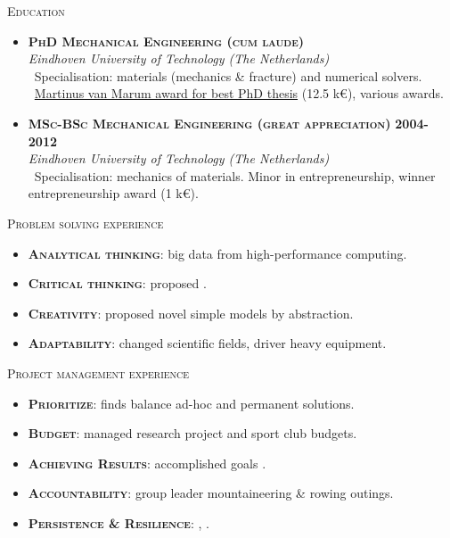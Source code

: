 \documentclass[11pt, a4paper]{article}
\newcommand{\dates}[1]{\hfill\mbox{\textbf{#1}}} %
\newcommand{\smaller}[1]{{\small\ #1}}
\newcommand{\headright}[1]{
    \vspace*{1.5ex}\textsc{\Large\color{cvblue}#1}\par%
    \vspace*{-2ex}{\color{cvblue}\hrulefill}\par
}
\begin{document}
\begin{minipage}[t]{0.56\textwidth}
    \headright{Education}

    \begin{itemize}
        \item
        \textbf{\textsc{PhD Mechanical Engineering (cum laude)}} \dates{\MyDatePhD} \\
        \textit{Eindhoven University of Technology (The Netherlands)} \\
        \smaller{Specialisation: materials (mechanics \& fracture) and numerical solvers.} \\
        \smaller{\href{https://www.geus.me/education.html\#doctor-of-philosophy}{Martinus van Marum award for best PhD thesis} (12.5 k\euro), various awards.}
        \item
        \textbf{\textsc{MSc-BSc Mechanical Engineering (great appreciation)}} \dates{2004-2012} \\
        \textit{Eindhoven University of Technology (The Netherlands)} \\
        \smaller{Specialisation: mechanics of materials. Minor in entrepreneurship, winner entrepreneurship award (1 k\euro).}
    \end{itemize}

    \headright{Problem solving experience}

    \begin{itemize}
        \item \textbf{\textsc{Analytical thinking}}: big data from high-performance computing.
        \item \textbf{\textsc{Critical thinking}}: proposed .
        \item \textbf{\textsc{Creativity}}: proposed novel simple models by abstraction.
        \item \textbf{\textsc{Adaptability}}: changed scientific fields, driver heavy equipment.
    \end{itemize}

    \headright{Project management experience}

    \begin{itemize}
        \item \textbf{\textsc{Prioritize}}: finds balance ad-hoc and permanent solutions.
        \item \textbf{\textsc{Budget}}: managed research project and sport club budgets.
        \item \textbf{\textsc{Achieving Results}}: accomplished goals .
        \item \textbf{\textsc{Accountability}}: group leader mountaineering \& rowing outings.
        \item \textbf{\textsc{Persistence \& Resilience}}: , .
    \end{itemize}


\end{minipage}
\end{document}
